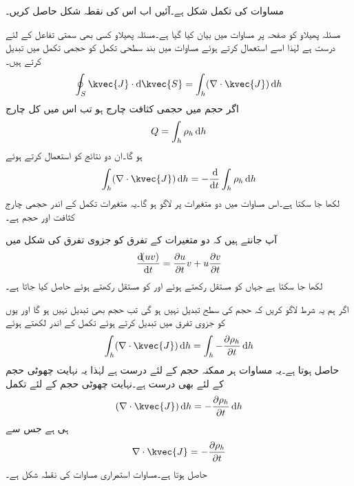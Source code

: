مساوات   کی تکمل شکل ہے۔آئیں اب اس کی نقطہ شکل حاصل کریں۔

مسئلہ پھیلاو کو صفحہ  پر مساوات  میں بیان کیا گیا ہے۔مسئلہ پھیلاو کسی بھی سمتی تفاعل کے لئے درست ہے لہٰذا اسے استعمال کرتے ہوئے مساوات  میں بند سطحی تکمل کو حجمی تکمل میں تبدیل کرتے ہیں۔
\begin{align*}
\oint_S \kvec{J} \cdot \dif \kvec{S}=\int_h (\nabla \cdot \kvec{J}) \dif h
\end{align*}
اگر حجم میں حجمی کثافت چارج  ہو تب اس میں کل چارج
\begin{align*}
Q=\int_h \rho_h \dif h
\end{align*}
ہو گا۔ان دو نتائج کو استعمال کرتے ہوئے
\begin{align*}
\int_h (\nabla \cdot \kvec{J}) \dif h=-\frac{\dif}{\dif t} \int_h \rho_h \dif h
\end{align*}
لکھا جا سکتا ہے۔اس مساوات میں  دو متغیرات پر لاگو ہو گا۔یہ متغیرات تکمل کے اندر حجمی چارج کثافت  اور حجم  ہے۔

آپ جانتے ہیں کہ دو متغیرات کے تفرق کو جزوی تفرق کی شکل میں
\begin{align*}
\frac{\dif (uv)}{\dif t}=\frac{\partial u}{\partial t} v+ u  \frac{\partial v}{\partial t}
\end{align*}
لکھا جا سکتا ہے جہاں  کو مستقل رکھتے ہوئے  اور  کو مستقل رکھتے ہوئے  حاصل کیا جاتا ہے۔

اگر ہم یہ شرط لاگو کریں کہ حجم کی سطح تبدیل نہیں ہو گی تب حجم بھی تبدیل نہیں ہو گا اور یوں  کو جزوی تفرق میں تبدیل کرتے ہوئے تکمل کے اندر لکھتے ہوئے
\begin{align*}
\int_h (\nabla \cdot \kvec{J}) \dif h=\int_h -\frac{\partial \rho_h}{\partial t} \dif h
\end{align*}
حاصل ہوتا ہے۔یہ مساوات ہر ممکنہ حجم کے لئے درست ہے لہٰذا یہ نہایت چھوٹی حجم کے لئے بھی درست ہے۔نہایت چھوٹی حجم  کے لئے تکمل
\begin{align*}
 (\nabla \cdot \kvec{J}) \dif h= -\frac{\partial \rho_h}{\partial t} \dif h
\end{align*}
ہی ہے جس سے
\begin{align}\label{مساوات_کپیسٹر_استمراری_مساوات_نقطہ_شکل}
\nabla \cdot \kvec{J}=-\frac{\partial \rho_h}{\partial t}
\end{align}
حاصل ہوتا ہے۔مساوات  استمراری مساوات کی نقطہ شکل ہے۔

